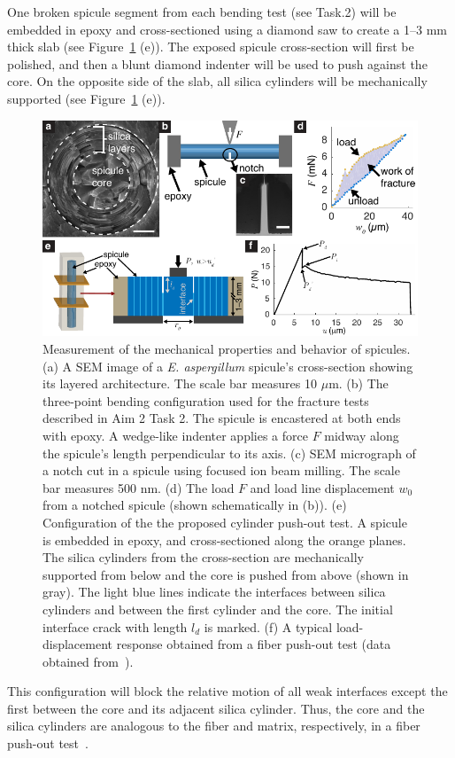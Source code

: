 \documentclass[10pt,letterpaper]{article}
\begin{document}
        One broken spicule segment from each bending test (see Task.2) will be embedded in epoxy and cross-sectioned using a diamond saw to create a 1--3 mm thick slab (see Figure~\ref{f:exp} (e)).
        The exposed spicule cross-section will first be polished, and then a blunt diamond indenter will be used to push against the core.
        On the opposite side of the slab, all silica cylinders will be mechanically supported (see Figure~\ref{f:exp} (e)).
        \begin{figure}[h!]
          \centering
            \includegraphics[width=\textwidth]{Figures/Spicule/Layer_spicule_ver11.pdf}
            \caption{\footnotesize Measurement of the mechanical properties and behavior of spicules. (a) A SEM image of a \textit{E. aspergillum} spicule's cross-section showing its layered architecture. The scale bar measures 10 $\mu$m. (b) The three-point bending configuration used for the fracture tests described in Aim 2 Task 2. The spicule is encastered at both ends with epoxy. A wedge-like indenter applies a force $F$ midway along the spicule's length perpendicular to its axis. (c) SEM micrograph of a notch cut in a spicule using focused ion beam milling. The scale bar measures 500 nm. (d) The load $F$ and load line displacement $w_0$ from a notched spicule (shown schematically in (b)). (e) Configuration of the the proposed cylinder push-out test. A spicule is embedded in epoxy, and cross-sectioned along the orange planes. The silica cylinders from the cross-section are mechanically supported from below and the core is pushed from above (shown in gray). The light blue lines indicate the interfaces between silica cylinders and between the first cylinder and the core. The initial interface crack with length $l_d$ is marked. (f) A typical load-displacement response obtained from a fiber push-out test (data obtained from~\cite{bright1989interfacial}).}
            \label{f:exp}
        \end{figure}
        This configuration will block the relative motion of all weak interfaces except the first between the core and its adjacent silica cylinder.
        Thus, the core and the silica cylinders are analogous to the fiber and matrix, respectively, in a fiber push-out test~\cite{marshall1984indentation}.
\end{document}
